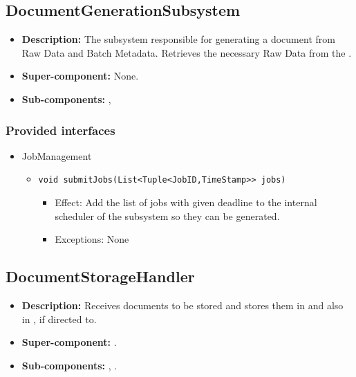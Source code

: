 \subsection{DocumentGenerationSubsystem}
\begin{itemize}
    \item \textbf{Description:} The subsystem responsible for generating a document from Raw Data and Batch Metadata. Retrieves the necessary Raw Data from the .
    \item \textbf{Super-component:} None.
    \item \textbf{Sub-components:} , \ttt{}
\end{itemize}

\subsubsection*{Provided interfaces}
\begin{itemize}
    \item JobManagement
    \begin{itemize}
        \item \texttt{void submitJobs(List<Tuple<JobID,TimeStamp>> jobs)}
        \begin{itemize}
            \item Effect: Add the list of jobs with given deadline to the internal scheduler of the subsystem so they can be generated.
            \item Exceptions: None
        \end{itemize}
    \end{itemize}
\end{itemize}

\subsection{DocumentStorageHandler} 
\begin{itemize}
    \item \textbf{Description:} Receives documents to be stored and stores them in  and also in , if directed to.
    \item \textbf{Super-component:} .
    \item \textbf{Sub-components:} , .
\end{itemize}

